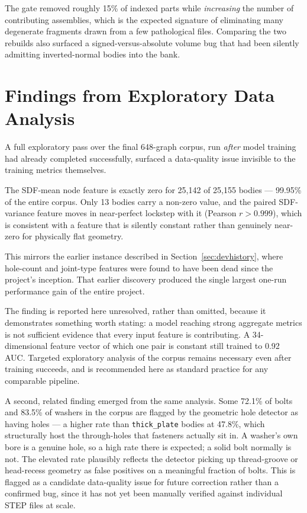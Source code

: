 \documentclass[12pt,oneside,a4paper]{report}
\begin{document}
The gate removed roughly 15\% of indexed parts while \emph{increasing} the
number of contributing assemblies, which is the expected signature of
eliminating many degenerate fragments drawn from a few pathological files.
Comparing the two rebuilds also surfaced a signed-versus-absolute volume bug
that had been silently admitting inverted-normal bodies into the bank.

\section{Findings from Exploratory Data Analysis}
\label{sec:eda-finding}

A full exploratory pass over the final 648-graph corpus, run \emph{after}
model training had already completed successfully, surfaced a data-quality
issue invisible to the training metrics themselves.

The SDF-mean node feature is exactly zero for 25,142 of 25,155 bodies ---
99.95\% of the entire corpus. Only 13 bodies carry a non-zero value, and the
paired SDF-variance feature moves in near-perfect lockstep with it (Pearson
$r > 0.999$), which is consistent with a feature that is silently constant
rather than genuinely near-zero for physically flat geometry.

This mirrors the earlier instance described in Section~\ref{sec:devhistory},
where hole-count and joint-type features were found to have been dead since
the project's inception. That earlier discovery produced the single largest
one-run performance gain of the entire project.

The finding is reported here unresolved, rather than omitted, because it
demonstrates something worth stating: a model reaching strong aggregate
metrics is not sufficient evidence that every input feature is contributing.
A 34-dimensional feature vector of which one pair is constant still trained
to 0.92 AUC. Targeted exploratory analysis of the corpus remains necessary
even after training succeeds, and is recommended here as standard practice
for any comparable pipeline.

A second, related finding emerged from the same analysis. Some 72.1\% of
bolts and 83.5\% of washers in the corpus are flagged by the geometric hole
detector as having holes --- a higher rate than \texttt{thick\_plate} bodies
at 47.8\%, which structurally host the through-holes that fasteners actually
sit in. A washer's own bore is a genuine hole, so a high rate there is
expected; a solid bolt normally is not. The elevated rate plausibly reflects
the detector picking up thread-groove or head-recess geometry as false
positives on a meaningful fraction of bolts. This is flagged as a candidate
data-quality issue for future correction rather than a confirmed bug, since
it has not yet been manually verified against individual STEP files at scale.
\end{document}
